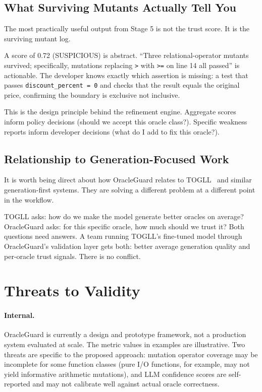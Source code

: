 \documentclass[conference]{IEEEtran}
\begin{document}
\subsection{What Surviving Mutants Actually Tell You}

The most practically useful output from Stage 5 is not the trust score. It is the surviving mutant log.

A score of 0.72 (SUSPICIOUS) is abstract. ``Three relational-operator mutants survived; specifically, mutations replacing \texttt{>} with \texttt{>=} on line 14 all passed'' is actionable. The developer knows exactly which assertion is missing: a test that passes \texttt{discount\_percent = 0} and checks that the result equals the original price, confirming the boundary is exclusive not inclusive.

This is the design principle behind the refinement engine. Aggregate scores inform policy decisions (should we accept this oracle class?). Specific weakness reports inform developer decisions (what do I add to fix this oracle?).

\subsection{Relationship to Generation-Focused Work}

It is worth being direct about how OracleGuard relates to TOGLL~\cite{hossain2024togll} and similar generation-first systems. They are solving a different problem at a different point in the workflow.

TOGLL asks: how do we make the model generate better oracles on average? OracleGuard asks: for this specific oracle, how much should we trust it? Both questions need answers. A team running TOGLL's fine-tuned model through OracleGuard's validation layer gets both: better average generation quality and per-oracle trust signals. There is no conflict.

\section{Threats to Validity}

\paragraph{Internal.} OracleGuard is currently a design and prototype framework, not a production system evaluated at scale. The metric values in examples are illustrative. Two threats are specific to the proposed approach: mutation operator coverage may be incomplete for some function classes (pure I/O functions, for example, may not yield informative arithmetic mutations), and LLM confidence scores are self-reported and may not calibrate well against actual oracle correctness.
\end{document}
